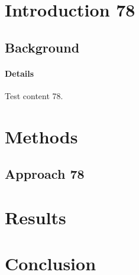 \documentclass{article}
\begin{document}
\section{Introduction 78}
\subsection{Background}
\paragraph{Details} Test content 78.
\section{Methods}
\subsection{Approach 78}
\section{Results}
\section{Conclusion}
\end{document}
